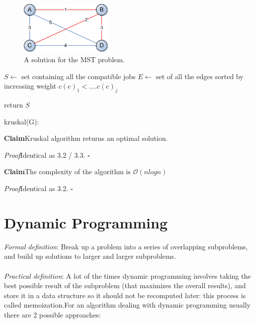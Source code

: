 \documentclass[11pt]{article}
\newenvironment{claim}[1]{\par\textbf{Claim}\space#1}{}
\newenvironment{proof}[1]{\par\textit{Proof}\space#1}{\hfill\ensuremath{\square}}
\begin{document}
\begin{figure}[H]
		\centering
		\includegraphics[width=0.4\textwidth ]{kruskal_solved}
		\caption{A solution for the MST problem.}
\end{figure}

\begin{algorithm}[H]
\SetAlgoLined
\small
{}
\BlankLine

$S \leftarrow$ set containing all the compatible jobs\;
$E \leftarrow$ set of all the edges sorted by increasing weight $c(e)_{1} < .... c(e)_{j}$

\BlankLine


\BlankLine

return $S$\;
\caption{kruskal(G):}
\end{algorithm}

\begin{claim}
Kruskal algorithm returns an optimal solution.
\end{claim}
\begin{proof}
Identical as 3.2 / 3.3.
\end{proof}\\
 
\begin{claim}
The complexity of the algorithm is $\mathcal{O}{(nlogn)}$
\end{claim}
\begin{proof}
Identical as 3.2.
\end{proof}\\

\clearpage
\section{Dynamic Programming}

\emph{Formal definition}: Break up a problem into a series of overlapping subproblems, and build up solutions to larger and larger subproblems.\\\\\emph{Practical definition}: A lot of the times dynamic programming involves taking the best possible result of the subproblem (that maximizes the overall results), and store it in a data structure so it should not be recomputed later: this process is called memoization.For an algorithm dealing with dynamic programming usually there are 2 possible approaches:\\
\end{document}
